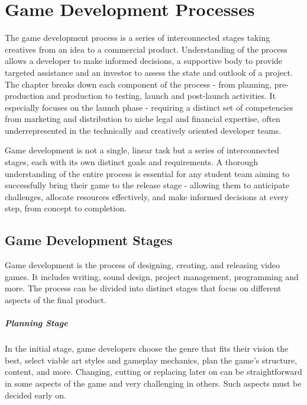 \chapter{Game Development Processes}

\begin{chapterabstract}
	The game development process is a series of interconnected stages taking creatives from an idea to a commercial product. Understanding of the process allows a developer to make informed decisions, a supportive body to provide targeted assistance and an investor to assess the state and outlook of a project. The chapter breaks down each component of the process - from planning, pre-production and production to testing, launch and post-launch activities. It especially focuses on the launch phase - requiring a distinct set of competencies from marketing and distribution to niche legal and financial expertise, often underrepresented in the technically and creatively oriented developer teams.
\end{chapterabstract}

Game development is not a single, linear task but a series of interconnected stages, each with its own distinct goals and requirements. A thorough understanding of the entire process is essential for any student team aiming to successfully bring their game to the release stage - allowing them to anticipate challenges, allocate resources effectively, and make informed decisions at every step, from concept to completion.

\section{Game Development Stages}
Game development is the process of designing, creating, and releasing video games. It includes writing, sound design, project management, programming and more. The process can be divided into distinct stages that focus on different aspects of the final product.
\cite{bramble_7-stages, rocket_6-stages}

\paragraph{Planning Stage}
In the initial stage, game developers choose the genre that fits their vision the best, select viable art styles and gameplay mechanics, plan the game’s structure, content, and more. Changing, cutting or replacing later on can be straightforward in some aspects of the game and very challenging in others. Such aspects must be decided early on.
\cite{bramble_7-stages, rocket_6-stages}

